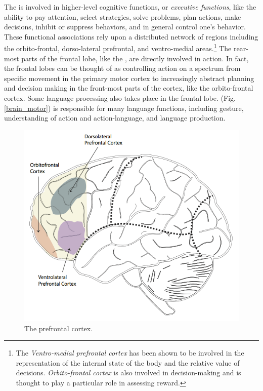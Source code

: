 The  is involved in higher-level cognitive functions, or \emph{executive functions}, like the ability to pay attention, select strategies, solve problems, plan actions, make decisions, inhibit or suppress behaviors, and in general control one's behavior. These functional associations rely upon a distributed network of regions including the orbito-frontal, dorso-lateral prefrontal, and ventro-medial areas.\footnote{The \emph{Ventro-medial prefrontal cortex} has been shown to be involved in the representation of the internal state of the body and the relative value of decisions. \emph{Orbito-frontal cortex} is also involved in decision-making and is thought to play a particular role in assessing reward.} The rear-most parts of the frontal lobe, like the , are directly involved in action. In fact, the frontal lobes can be thought of as controlling action on a spectrum from specific movement in the primary motor cortex to  increasingly abstract planning and decision making in the front-most parts of the cortex, like the orbito-frontal cortex. Some language processing also takes place in the frontal lobe.  (Fig. \ref{brain_motor}) is responsible for many language functions, including gesture, understanding of action and action-language, and language production. 

\begin{figure}[h]
\centering
\includegraphics[scale=.75]{./images/brain_frontal.png}
\caption[Pamela Payne.]{The prefrontal cortex.}
\label{brain_frontal}
\end{figure}

